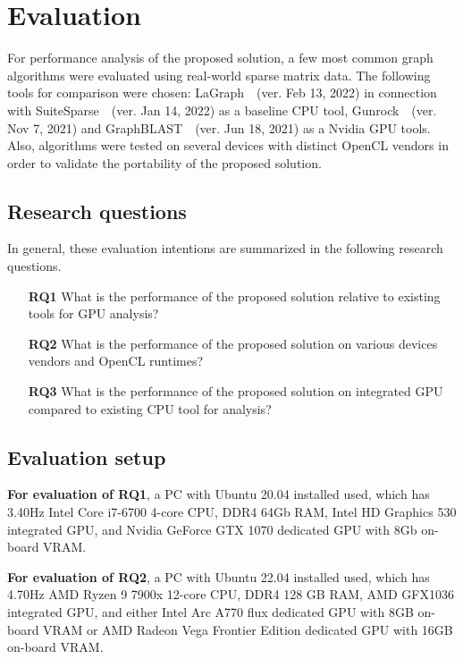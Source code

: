 \section{Evaluation}

For performance analysis of the proposed solution, a few most common graph algorithms were evaluated using real-world sparse matrix data. 
The following tools for comparison were chosen: LaGraph~\cite{misc:la_graph}~(ver. Feb 13, 2022) in connection with SuiteSparse~\cite{article:suite_sparse_for_graph_problems}~(ver. Jan 14, 2022) as a baseline CPU tool, Gunrock~\cite{article:gunrock}~(ver. Nov 7, 2021) and GraphBLAST~\cite{yang2019graphblast}~(ver. Jun 18, 2021) as a Nvidia GPU tools. 
Also, algorithms were tested on several devices with distinct OpenCL vendors in order to validate the portability of the proposed solution. 

\subsection{Research questions}

In general, these evaluation intentions are summarized in the following research questions. 

\vspace{0.2cm}
\begin{itemize}
    \item[\textbf{RQ1}] What is the performance of the proposed solution relative to existing tools for GPU analysis?

    \item[\textbf{RQ2}] What is the performance of the proposed solution on various devices vendors and OpenCL runtimes?

    \item[\textbf{RQ3}] What is the performance of the proposed solution on integrated GPU compared to existing CPU tool for analysis?
\end{itemize}

\subsection{Evaluation setup}

\textbf{For evaluation of RQ1}, a PC with Ubuntu 20.04 installed used, which has 3.40Hz Intel Core i7-6700 4-core CPU, DDR4 64Gb RAM, Intel HD Graphics 530 integrated GPU, and Nvidia GeForce GTX 1070 dedicated GPU with 8Gb on-board VRAM. 

\textbf{For evaluation of RQ2}, a PC with Ubuntu 22.04 installed used, which has 4.70Hz AMD Ryzen 9 7900x 12-core CPU, DDR4 128 GB RAM, AMD GFX1036 integrated GPU, and either Intel Arc A770 flux dedicated GPU with 8GB on-board VRAM or AMD Radeon Vega Frontier Edition dedicated GPU with 16GB on-board VRAM.

